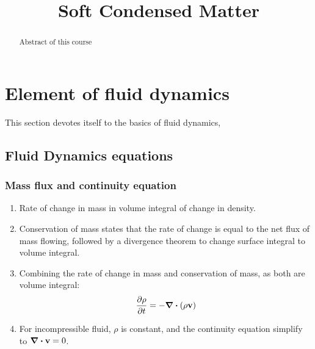 \documentclass[12pt,a4paper]{article}
\newcommand{\topic}{Soft Condensed Matter}
\begin{document}
\title{\topic}
\begin{titlepage}
    \maketitle
\end{titlepage}

\tableofcontents

\newpage
\begin{abstract}
\noindent
Abstract of this course
\end{abstract}

\section{Element of fluid dynamics}
This section devotes itself to the basics of fluid dynamics,
    \subsection{Fluid Dynamics equations}
        \subsubsection{Mass flux and continuity equation}
            \begin{enumerate}
                \item  Rate of change in mass in volume integral of change in density.
                \item  Conservation of mass states that the rate of change is equal to the net flux of mass flowing, 
                followed by a divergence theorem to change surface integral to volume integral.
                \item Combining the rate of change in mass and conservation of mass, as both are volume integral:            
                $$
                    \pdv{\rho}{t} = -\div(\rho \vb{v})
                $$
                \item For incompressible fluid, $\rho$ is constant, and the continuity equation simplify to $\div\vb{v} = 0$.
            \end{enumerate}
\end{document}
